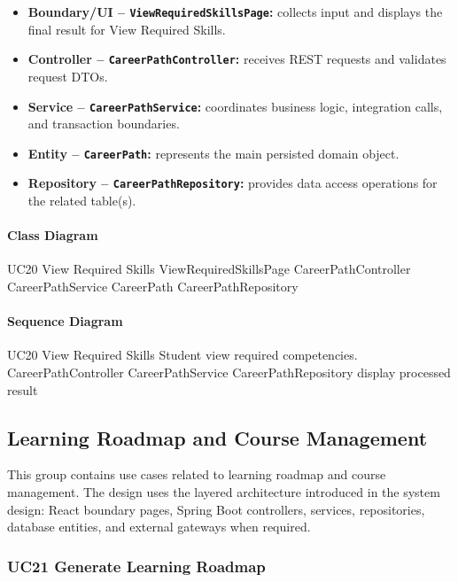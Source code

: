 \begin{itemize}
    \item \textbf{Boundary/UI -- \texttt{ViewRequiredSkillsPage}:} collects input and displays the final result for View Required Skills.
    \item \textbf{Controller -- \texttt{CareerPathController}:} receives REST requests and validates request DTOs.
    \item \textbf{Service -- \texttt{CareerPathService}:} coordinates business logic, integration calls, and transaction boundaries.
    \item \textbf{Entity -- \texttt{CareerPath}:} represents the main persisted domain object.
    \item \textbf{Repository -- \texttt{CareerPathRepository}:} provides data access operations for the related table(s).
\end{itemize}

\paragraph{Class Diagram}

\ClassDiagram
{UC20 View Required Skills}
{ViewRequiredSkillsPage}
{CareerPathController}
{CareerPathService}
{CareerPath}
{CareerPathRepository}

\paragraph{Sequence Diagram}

\SequenceDiagram
{UC20 View Required Skills}
{Student}
{view required competencies.}
{CareerPathController}
{CareerPathService}
{CareerPathRepository}
{display processed result}

\subsection{Learning Roadmap and Course Management}

This group contains use cases related to learning roadmap and course management. The design uses the layered architecture introduced in the system design: React boundary pages, Spring Boot controllers, services, repositories, database entities, and external gateways when required.

\subsubsection{UC21 Generate Learning Roadmap}

